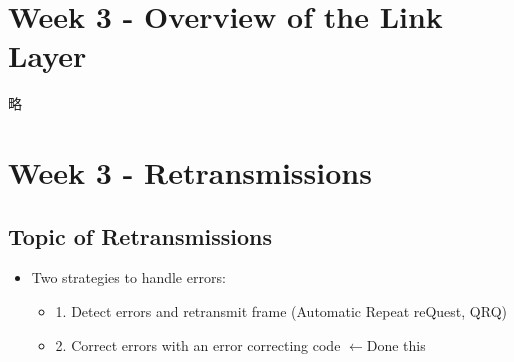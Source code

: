 \documentclass[12pt]{ctexart}   %
\begin{document}
\section{Week 3 - Overview of the Link Layer}
	略
\section{Week 3 - Retransmissions}
	\subsection{Topic of Retransmissions}
	\begin{itemize}
		\item Two strategies to handle errors:
		\begin{itemize}
			\item {\color{blue} 1.} Detect errors and retransmit frame (Automatic Repeat reQuest, QRQ)
			\item {\color{blue} 2.} {\color{gray} Correct errors with an error correcting code} {\color{pink}  $ \leftarrow$Done this}
		\end{itemize}
	\end{itemize}
	
\end{document}
